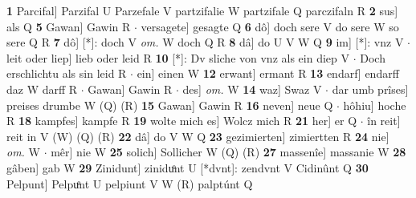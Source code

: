 \documentclass[8pt,a4paper,notitlepage]{article}
\begin{document}
\begin{table}[ht]
\begin{minipage}[t]{0.5\linewidth}
\textbf{1} Parcifal] Parzifal U Parzefale V partzifalie W partzifale Q parczifaln R \textbf{2} sus] als Q \textbf{5} Gawan] Gawin R  $\cdot$ versagete] gesagte Q \textbf{6} dô] doch sere V do sere W so sere Q R \textbf{7} dô] [*]: doch V \textit{om.} W doch Q R \textbf{8} dâ] do U V W Q \textbf{9} im] [*]: vnz V  $\cdot$ leit oder liep] lieb oder leid R \textbf{10} [*]: Dv sliche von vnz als ein diep V  $\cdot$ Doch erschlichtu als sin leid R  $\cdot$ ein] einen W \textbf{12} erwant] ermant R \textbf{13} endarf] endarff daz W darff R  $\cdot$ Gawan] Gawin R  $\cdot$ des] \textit{om.} W \textbf{14} waz] Swaz V  $\cdot$ dar umb prîses] preises drumbe W (Q) (R) \textbf{15} Gawan] Gawin R \textbf{16} neven] neue Q  $\cdot$ hôhiu] hoche R \textbf{18} kampfes] kampfe R \textbf{19} wolte mich es] Wolcz mich R \textbf{21} her] er Q  $\cdot$ în reit] reit in V (W) (Q) (R) \textbf{22} dâ] do V W Q \textbf{23} gezimierten] zimiertten R \textbf{24} nie] \textit{om.} W  $\cdot$ mêr] nie W \textbf{25} solich] Sollicher W (Q) (R) \textbf{27} massenîe] massanie W \textbf{28} gâben] gab W \textbf{29} Zinidunt] ziniduͦnt U [*dvnt]: zendvnt V Cidinûnt Q \textbf{30} Pelpunt] Pelpuͦnt U pelpiunt V W (R) palptúnt Q \newline
\end{minipage}
\end{table}
\end{document}
